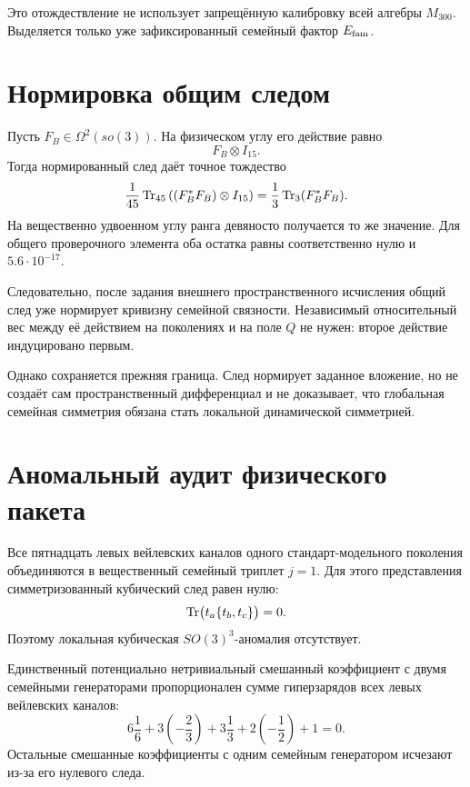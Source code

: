Это отождествление не использует запрещённую калибровку всей алгебры
$M_{300}$. Выделяется только уже зафиксированный семейный фактор
$E_{\rm fam}$.

\section{Нормировка общим следом}

Пусть $F_B\in\Omega^2(so(3))$. На физическом углу его действие равно
\begin{equation}
 F_B\otimes I_{15}.
\end{equation}
Тогда нормированный след даёт точное тождество
\begin{equation}
 \frac1{45}\operatorname{Tr}_{45}
 \left((F_B^*F_B)\otimes I_{15}\right)
 =\frac13\operatorname{Tr}_3(F_B^*F_B).
 \label{eq:v6-family-connection-trace-normalization}
\end{equation}
На вещественно удвоенном углу ранга девяносто получается то же значение.
Для общего проверочного элемента оба остатка равны соответственно нулю и
$5.6\cdot10^{-17}$.

Следовательно, после задания внешнего пространственного исчисления общий
след уже нормирует кривизну семейной связности. Независимый относительный
вес между её действием на поколениях и на поле $Q$ не нужен: второе
действие индуцировано первым.

Однако сохраняется прежняя граница. След нормирует заданное вложение, но
не создаёт сам пространственный дифференциал и не доказывает, что
глобальная семейная симметрия обязана стать локальной динамической
симметрией.

\section{Аномальный аудит физического пакета}

Все пятнадцать левых вейлевских каналов одного стандарт-модельного
поколения объединяются в вещественный семейный триплет $j=1$. Для этого
представления симметризованный кубический след равен нулю:
\begin{equation}
 \operatorname{Tr}\bigl(t_a\{t_b,t_c\}\bigr)=0.
\end{equation}
Поэтому локальная кубическая $SO(3)^3$-аномалия отсутствует.

Единственный потенциально нетривиальный смешанный коэффициент с двумя
семейными генераторами пропорционален сумме гиперзарядов всех левых
вейлевских каналов:
\begin{equation}
 6\frac16+3\left(-\frac23\right)
 +3\frac13+2\left(-\frac12\right)+1=0.
 \label{eq:v6-family-hypercharge-anomaly-sum}
\end{equation}
Остальные смешанные коэффициенты с одним семейным генератором исчезают
из-за его нулевого следа.

